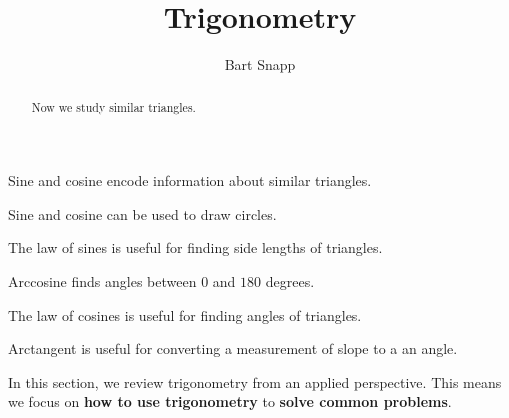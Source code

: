\documentclass[handout,nooutcomes,noauthor]{ximera}
\title{Trigonometry}
\author{Bart Snapp}
\begin{document}
\begin{abstract}
  Now we study similar triangles.
\end{abstract}
\maketitle


\begin{listSectionOutcomes}
\item Sine and cosine encode information about similar triangles.
\item Sine and cosine can be used to draw circles.
\item The law of sines is useful for finding side lengths of
  triangles.
\item Arccosine finds angles between $0$ and $180$ degrees.
\item The law of cosines is useful for finding angles of triangles.
\item Arctangent is useful for converting a measurement of slope to a
  an angle.
\end{listSectionOutcomes}


In this section, we review trigonometry from an applied
perspective. This means we focus on \textbf{how to use trigonometry}
to \textbf{solve common problems}.
\end{document}
